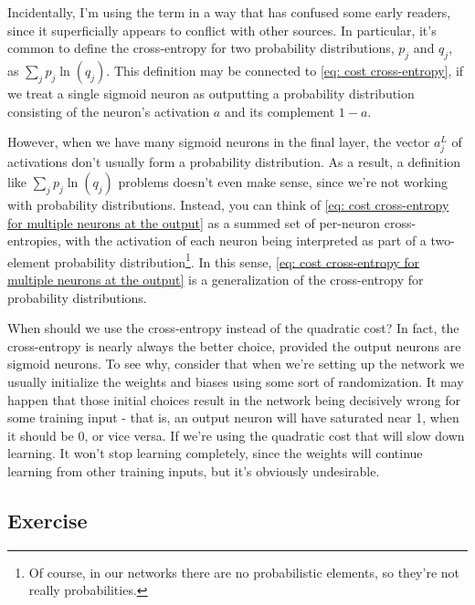 \documentclass[a4paper,11pt,twoside]{report}
\begin{document}
Incidentally, I'm using the term  in a way that has confused some early readers, since it superficially appears to conflict with other sources. In particular, it's common to define the cross-entropy for two probability distributions, $p_j$ and $q_j$, as $\sum_j p_j \ln(q_j)$. This definition may be connected to \ref{eq: cost cross-entropy}, if we treat a single sigmoid neuron as outputting a probability distribution consisting of the neuron's activation $a$ and its complement $1-a$.

However, when we have many sigmoid neurons in the final layer, the vector $a^L_j$ of activations don't usually form a probability distribution. As a result, a definition like $\sum_j p_j \ln(q_j)$
problems doesn't even make sense, since we're not working with probability distributions. Instead, you can think of \ref{eq: cost cross-entropy for multiple neurons at the output} as a summed set of per-neuron cross-entropies, with the activation of each neuron being interpreted as part of a two-element probability distribution\footnote{Of course, in our networks there are no probabilistic elements, so they're not really probabilities.}. In this sense, \ref{eq: cost cross-entropy for multiple neurons at the output} is a generalization of the cross-entropy for probability distributions.

When should we use the cross-entropy instead of the quadratic cost? In fact, the cross-entropy is nearly always the better choice, provided the output neurons are sigmoid neurons. To see why, consider that when we're setting up the network we usually initialize the weights and biases using some sort of randomization. It may happen that those initial choices result in the network being decisively wrong for some training input - that is, an output neuron will have saturated near 1, when it should be 0, or vice versa. If we're using the quadratic cost that will slow down learning. It won't stop learning completely, since the weights will continue learning from other training inputs, but it's obviously undesirable.

\subsection*{Exercise}
\label{Exercise: cross-entropy}
\end{document}
